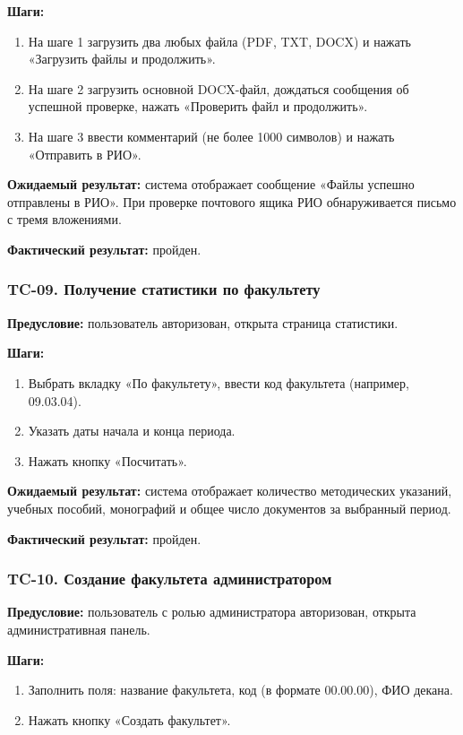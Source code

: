 \textbf{Шаги:}
\begin{enumerate}
	\item На шаге 1 загрузить два любых файла (PDF, TXT, DOCX) и нажать «Загрузить файлы и продолжить».
	\item На шаге 2 загрузить основной DOCX-файл, дождаться сообщения об успешной проверке, нажать «Проверить файл и продолжить».
	\item На шаге 3 ввести комментарий (не более 1000 символов) и нажать «Отправить в РИО».
\end{enumerate}

\textbf{Ожидаемый результат:} система отображает сообщение «Файлы успешно отправлены в РИО». При проверке почтового ящика РИО обнаруживается письмо с тремя вложениями.

\textbf{Фактический результат:} пройден.

\subsubsection{TC-09. Получение статистики по факультету}

\textbf{Предусловие:} пользователь авторизован, открыта страница статистики.

\textbf{Шаги:}
\begin{enumerate}
	\item Выбрать вкладку «По факультету», ввести код факультета (например, 09.03.04).
	\item Указать даты начала и конца периода.
	\item Нажать кнопку «Посчитать».
\end{enumerate}

\textbf{Ожидаемый результат:} система отображает количество методических указаний, учебных пособий, монографий и общее число документов за выбранный период.

\textbf{Фактический результат:} пройден.

\subsubsection{TC-10. Создание факультета администратором}

\textbf{Предусловие:} пользователь с ролью администратора авторизован, открыта административная панель.

\textbf{Шаги:}
\begin{enumerate}
	\item Заполнить поля: название факультета, код (в формате 00.00.00), ФИО декана.
	\item Нажать кнопку «Создать факультет».
\end{enumerate}


